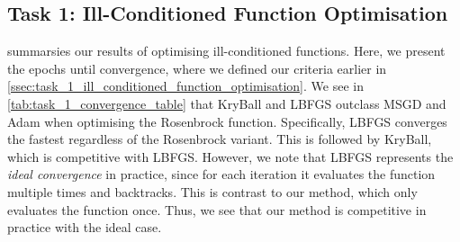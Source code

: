 \subsection{Task 1: Ill-Conditioned Function Optimisation}
\label{ssec:results_ill_conditioned_function_optimisation}

 summarsies our results of optimising ill-conditioned functions. Here, we present the epochs until convergence, where we defined our criteria earlier in \cref{ssec:task_1_ill_conditioned_function_optimisation}. We see in \cref{tab:task_1_convergence_table} that KryBall and LBFGS outclass MSGD and Adam when optimising the Rosenbrock function. Specifically, LBFGS converges the fastest regardless of the Rosenbrock variant. This is followed by KryBall, which is competitive with LBFGS. However, we note that LBFGS represents the \textit{ideal convergence} in practice, since for each iteration it evaluates the function multiple times and backtracks. This is contrast to our method, which only evaluates the function once. Thus, we see that our method is competitive in practice with the ideal case. 

